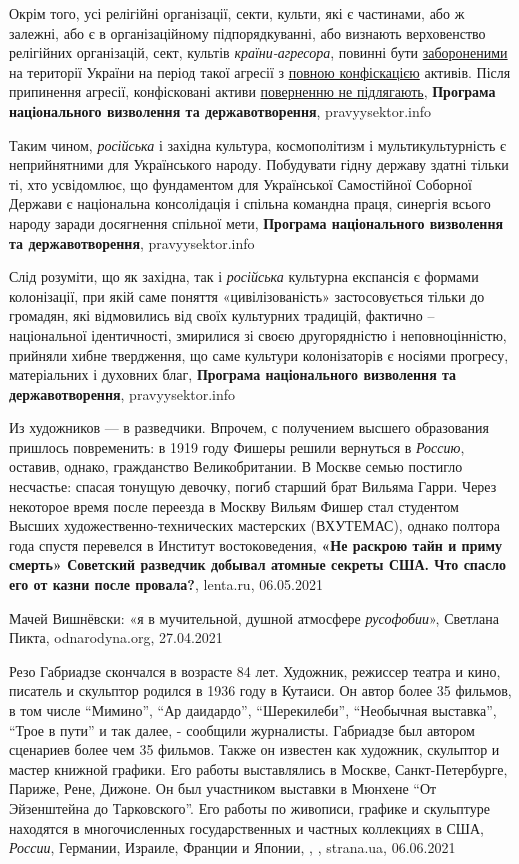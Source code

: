 Окрім того, усі релігійні організації, секти, культи, які є частинами, або ж
залежні, або є в організаційному підпорядкуванні, або визнають верховенство
релігійних організацій, сект, культів \emph{країни-агресора}, повинні бути
\underline{забороненими} на території України на період такої агресії з
\underline{повною конфіскацією} активів. Після припинення агресії, конфісковані
активи \underline{поверненню не підлягають},
\textbf{Програма національного визволення та державотворення}, pravyysektor.info

Таким чином, \emph{російська} і західна культура, космополітизм і мультикультурність є
неприйнятними для Українського народу. Побудувати гідну державу здатні тільки
ті, хто усвідомлює, що фундаментом для Української Самостійної Соборної Держави
є національна консолідація і спільна командна праця, синергія всього народу
заради досягнення спільної мети,
\textbf{Програма національного визволення та державотворення}, pravyysektor.info

Слід розуміти, що як західна, так і \emph{російська} культурна експансія є формами
колонізації, при якій саме поняття «цивілізованість» застосовується тільки до
громадян, які відмовились від своїх культурних традицій, фактично –
національної ідентичності, змирилися зі своєю другорядністю і неповноцінністю,
прийняли хибне твердження, що саме культури колонізаторів є носіями прогресу,
матеріальних і духовних благ,
\textbf{Програма національного визволення та державотворення}, pravyysektor.info

Из художников — в разведчики. Впрочем, с получением высшего образования
пришлось повременить: в 1919 году Фишеры решили вернуться в \emph{Россию},
оставив, однако, гражданство Великобритании. В Москве семью постигло несчастье:
спасая тонущую девочку, погиб старший брат Вильяма Гарри.  Через некоторое
время после переезда в Москву Вильям Фишер стал студентом Высших
художественно-технических мастерских (ВХУТЕМАС), однако полтора года спустя
перевелся в Институт востоковедения,
\textbf{«Не раскрою тайн и приму смерть» Советский разведчик добывал атомные секреты США. Что спасло его от казни после провала?},
lenta.ru, 06.05.2021

Мачей Вишнёвски: «я в мучительной, душной атмосфере \emph{русофобии}»,
Светлана Пикта, odnarodyna.org, 27.04.2021

Резо Габриадзе скончался в возрасте 84 лет. Художник, режиссер театра и кино,
писатель и скульптор родился в 1936 году в Кутаиси. Он автор более 35 фильмов,
в том числе \enquote{Мимино}, \enquote{Ар даидардо}, \enquote{Шерекилеби},
\enquote{Необычная выставка}, \enquote{Трое в пути} и так далее, - сообщили
журналисты. Габриадзе был автором сценариев более чем 35 фильмов. Также он
известен как художник, скульптор и мастер книжной графики. Его работы
выставлялись в Москве, Санкт-Петербурге, Париже, Рене, Дижоне. Он был
участником выставки в Мюнхене \enquote{От Эйзенштейна до Тарковского}. Его
работы по живописи, графике и скульптуре находятся в многочисленных
государственных и частных коллекциях в США, \emph{России}, Германии, Израиле,
Франции и Японии,
, , strana.ua, 06.06.2021


